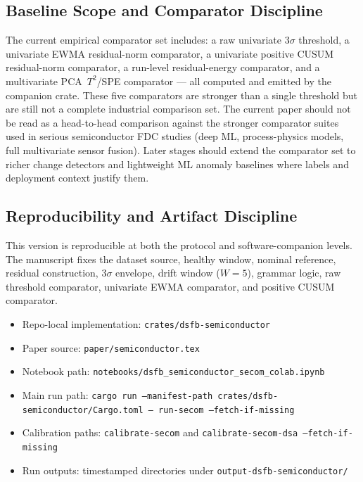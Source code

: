 \documentclass[11pt,letterpaper]{article}
\theoremstyle{scresult}
\begin{document}
\subsection{Baseline Scope and Comparator Discipline}

The current empirical comparator set includes: a raw univariate $3\sigma$
threshold, a univariate EWMA residual-norm comparator, a univariate positive
CUSUM residual-norm comparator, a run-level residual-energy comparator, and
a multivariate PCA~$T^2$/SPE comparator --- all computed and emitted by the
companion crate. These five comparators are stronger than a single threshold
but are still not a complete industrial comparison set. The current paper
should not be read as a head-to-head comparison against the stronger
comparator suites used in serious semiconductor FDC studies (deep ML,
process-physics models, full multivariate sensor fusion). Later stages should
extend the comparator set to richer change detectors and lightweight ML
anomaly baselines where labels and deployment context justify them.

\subsection{Reproducibility and Artifact Discipline}

This version is reproducible at both the protocol and software-companion
levels. The manuscript fixes the dataset source, healthy window, nominal
reference, residual construction, $3\sigma$ envelope, drift window ($W=5$),
grammar logic, raw threshold comparator, univariate EWMA comparator, and
positive CUSUM comparator.

\begin{itemize}
  \item Repo-local implementation: \texttt{crates/dsfb-semiconductor}
  \item Paper source: \texttt{paper/semiconductor.tex}
  \item Notebook path: \texttt{notebooks/dsfb\_semiconductor\_secom\_colab.ipynb}
  \item Main run path: \texttt{cargo run --manifest-path crates/dsfb-semiconductor/Cargo.toml -- run-secom --fetch-if-missing}
  \item Calibration paths: \texttt{calibrate-secom} and
        \texttt{calibrate-secom-dsa --fetch-if-missing}
  \item Run outputs: timestamped directories under
        \texttt{output-dsfb-semiconductor/}
\end{itemize}
\end{document}
